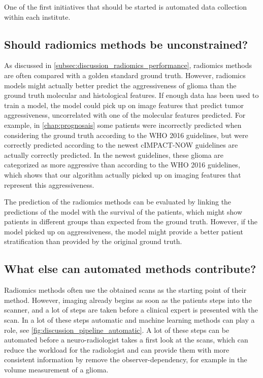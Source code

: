 One of the first initiatives that should be started is automated data collection within each institute.


\subsection{Should radiomics methods be unconstrained?}

As discussed in \cref{subsec:discussion_radiomics_performance}, radiomics methods are often compared with a golden standard ground truth.
However, radiomics models might actually better predict the aggressiveness of \gls{glioma} than the ground truth molecular and histological features.
If enough data has been used to train a model, the model could pick up on image features that predict \gls{tumor} aggressiveness, uncorrelated with one of the molecular features predicted.
For example, in \cref{chap:prognosais} some patients were incorrectly predicted when considering the ground truth according to the \gls{WHO} 2016 guidelines, but were correctly predicted according to the newest cIMPACT-NOW guidelines are actually correctly predicted.
In the newest guidelines, these glioma are categorized as more aggressive than according to the \gls{WHO} 2016 guidelines, which shows that our algorithm actually picked up on imaging features that represent this aggressiveness.

The prediction of the radiomics methods can be evaluated by linking the predictions of the model with the survival of the patients, which might show patients in different groups than expected from the ground truth.
However, if the model picked up on aggressiveness, the model might provide a better patient stratification than provided by the original ground truth.


\subsection{What else can automated methods contribute?}

Radiomics methods often use the obtained scans as the starting point of their method.
However, imaging already begins as soon as the patients steps into the scanner, and a lot of steps are taken before a clinical expert is presented with the scan.
In a lot of these steps automatic and machine learning methods can play a role, see \cref{fig:discussion_pipeline_automatic}.
A lot of these steps can be automated before a neuro-radiologist takes a first look at the scans, which can reduce the workload for the radiologist and can provide them with more consistent information by remove the observer-dependency, for example in the volume measurement of a \gls{glioma}.


